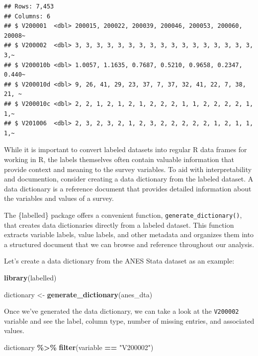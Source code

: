 \documentclass[
]{krantz}
\makeatletter
\newenvironment{Shaded}{\begin{snugshade}}{\end{snugshade}}
\newcommand{\FunctionTok}[1]{\textcolor[rgb]{0.27,0.27,0.27}{\textbf{#1}}}
\newcommand{\NormalTok}[1]{#1}
\newcommand{\OtherTok}[1]{\textcolor[rgb]{0.37,0.37,0.37}{#1}}
\newcommand{\SpecialCharTok}[1]{\textcolor[rgb]{0.43,0.43,0.43}{\textbf{#1}}}
\newcommand{\StringTok}[1]{\textcolor[rgb]{0.5,0.5,0.5}{#1}}
\newenvironment{kframe}{%
\medskip{}
\setlength{\fboxsep}{.8em}
 \def\at@end@of@kframe{}%
 \ifinner\ifhmode%
  \def\at@end@of@kframe{\end{minipage}}%
  \begin{minipage}{\columnwidth}%
 \fi\fi%
 \def\FrameCommand##1{\hskip\@totalleftmargin \hskip-\fboxsep
 \colorbox{shadecolor}{##1}\hskip-\fboxsep
     \hskip-\linewidth \hskip-\@totalleftmargin \hskip\columnwidth}%
 \MakeFramed {\advance\hsize-\width
   \@totalleftmargin\z@ \linewidth\hsize
   \@setminipage}}%
 {\par\unskip\endMakeFramed%
 \at@end@of@kframe}
\renewenvironment{Shaded}{\begin{kframe}}{\end{kframe}}
\makeatother
\begin{document}
\begin{verbatim}
## Rows: 7,453
## Columns: 6
## $ V200001  <dbl> 200015, 200022, 200039, 200046, 200053, 200060, 20008~
## $ V200002  <dbl> 3, 3, 3, 3, 3, 3, 3, 3, 3, 3, 3, 3, 3, 3, 3, 3, 3, 3,~
## $ V200010b <dbl> 1.0057, 1.1635, 0.7687, 0.5210, 0.9658, 0.2347, 0.440~
## $ V200010d <dbl> 9, 26, 41, 29, 23, 37, 7, 37, 32, 41, 22, 7, 38, 21, ~
## $ V200010c <dbl> 2, 2, 1, 2, 1, 2, 1, 2, 2, 2, 1, 1, 2, 2, 2, 2, 1, 1,~
## $ V201006  <dbl> 2, 3, 2, 3, 2, 1, 2, 3, 2, 2, 2, 2, 2, 1, 2, 1, 1, 1,~
\end{verbatim}

While it is important to convert labeled datasets into regular R data frames for working in R, the labels themselves often contain valuable information that provide context and meaning to the survey variables. To aid with interpretability and documention, consider creating a data dictionary from the labeled dataset. A data dictionary is a reference document that provides detailed information about the variables and values of a survey.

The \{labelled\} package offers a convenient function, \texttt{generate\_dictionary()}, that creates data dictionaries directly from a labeled dataset. This function extracts variable labels, value labels, and other metadata and organizes them into a structured document that we can browse and reference throughout our analysis.

Let's create a data dictionary from the ANES Stata dataset as an example:

\begin{Shaded}
\begin{Highlighting}[]
\FunctionTok{library}\NormalTok{(labelled)}

\NormalTok{dictionary }\OtherTok{\textless{}{-}} \FunctionTok{generate\_dictionary}\NormalTok{(anes\_dta)}
\end{Highlighting}
\end{Shaded}

Once we've generated the data dictionary, we can take a look at the \texttt{V200002} variable and see the label, column type, number of missing entries, and associated values.

\begin{Shaded}
\begin{Highlighting}[]
\NormalTok{dictionary }\SpecialCharTok{\%\textgreater{}\%}
  \FunctionTok{filter}\NormalTok{(variable }\SpecialCharTok{==} \StringTok{"V200002"}\NormalTok{)}
\end{Highlighting}
\end{Shaded}
\end{document}
